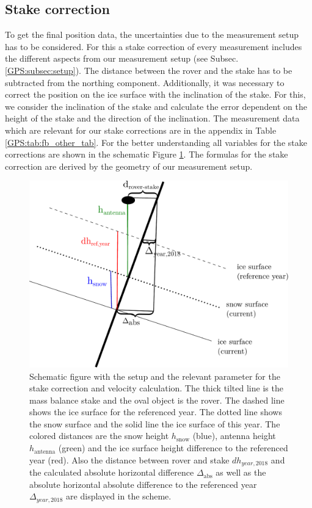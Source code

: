 \subsection{Stake correction}
To get the final position data, the uncertainties due to the measurement setup has to be considered.
For this a stake correction of every measurement includes the different aspects from our measurement setup (see Subsec. \ref{GPS:subsec:setup}).
The distance between the rover and the stake has to be subtracted from the northing component.
Additionally, it was necessary to correct the position on the ice surface with the inclination of the stake. 
For this, we consider the inclination of the stake and calculate the error dependent on the height of the stake and the direction of the inclination.
The measurement data which are relevant for our stake corrections are in the appendix in Table \ref{GPS:tab:fb_other_tab}.
For the better understanding all variables for the stake corrections are shown in the schematic Figure \ref{GPS:fig:scheme}.
The formulas for the stake correction are derived by the geometry of our measurement setup.

\begin{figure}[H]
	\centering
	\includegraphics[width=0.9\linewidth]{./figs/pictures/schematic_setup.pdf}
	\caption{Schematic figure with the setup and the relevant parameter for the stake correction and velocity calculation. The thick tilted line is the mass balance stake and the oval object is the rover. The dashed line shows the ice surface for the referenced year. The dotted line shows the snow surface and the solid line the ice surface of this year. The colored distances are the snow height $h_{\text{snow}}$ (blue), antenna height $h_{\text{antenna}}$ (green) and the ice surface height difference to the referenced year (red). Also the distance between rover and stake $dh_{year,2018}$ and the calculated absolute horizontal difference $\Delta_{\text{abs}}$ as well as the absolute horizontal absolute difference to the referenced year $\Delta_{year,2018}$ are displayed in the scheme.}
	\label{GPS:fig:scheme}
\end{figure}

